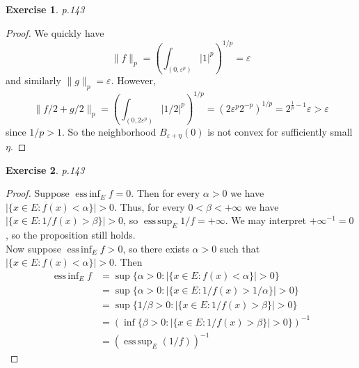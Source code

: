 \documentclass[11pt,a4paper]{article}
\newcommand{\alp}{\alpha}
\newcommand{\vare}{\varepsilon}
\renewcommand{\(}{\left(}
\renewcommand{\)}{\right)}
\renewcommand{\[}{\left[}
\renewcommand{\]}{\right]}
\newtheorem{exercise}{Exercise}
\DeclareMathOperator*{\esssup}{ess\,sup}
\DeclareMathOperator*{\essinf}{ess\,inf}
\begin{document}
  \setcounter{exercise}{6}
  
  \begin{exercise}
  	p.143
  \end{exercise}
  \begin{proof}
  	We quickly have 
  	$$
  	\|f\|_p=\(\int_{(0,\varepsilon^p)}|1|^p\)^{1/p} = \varepsilon
  	$$
  	and similarly $\|g\|_p=\varepsilon$. However,
  	$$
  	\|f/2+g/2\|_p = \(\int_{(0,2\varepsilon^p)}|1/2|^p\)^{1/p} = \(2\vare^p2^{-p}\)^{1/p}=2^{\frac{1}{p}-1}\varepsilon>\varepsilon
  	$$
  	since $1/p>1$. So the neighborhood $B_{\vare+\eta}(0)$ is not convex for sufficiently small $\eta$.
  \end{proof}
  
  \setcounter{exercise}{8}
  
  \begin{exercise}
  	p.143
  \end{exercise}
  \begin{proof}
  	Suppose $\essinf_Ef = 0$. Then for every $\alpha>0$ we have $|\{x\in E:f(x)<\alp\}|>0$. Thus, for every $0<\beta<+\infty$ we have $|\{x\in E:1/f(x)>\beta\}|>0$, so $\esssup_E 1/f = +\infty$. We may interpret $+\infty^{-1} = 0$, so the proposition still holds.\\
  	
  	Now suppose $\essinf_Ef>0$, so there exists $\alp>0$ such that $|\{x\in E:f(x)<\alp\}|>0$. Then
  	\begin{align*}
  	\essinf_E f &= \sup\{\alp>0:|\{x\in E:f(x)<\alp\}|>0\}\\
  	&=\sup\{\alp>0:|\{x\in E:1/f(x)>1/\alp\}|>0\}\\
  	&=\sup\{1/\beta>0:|\{x\in E:1/f(x)>\beta\}|>0\}\\
  	&=\(\inf\{\beta>0:|\{x\in E:1/f(x)>\beta\}|>0\}\)^{-1}\\	
  	&=\(\esssup_E (1/f)\)^{-1}
  	\end{align*}
  \end{proof}
\end{document}
